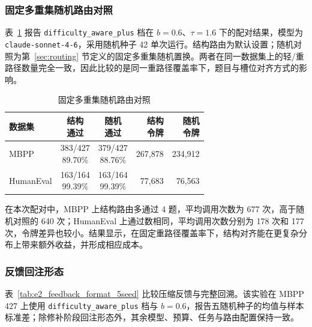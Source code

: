 \subsubsection{固定多重集随机路由对照}

表~\ref{tab:route_random_multiset} 报告 \texttt{difficulty\_aware\_plus} 档在 $b{=}0.6$、$\tau{=}1.6$ 下的配对结果，模型为 \texttt{claude-sonnet-4-6}，采用随机种子 42 单次运行。结构路由为默认设置；随机对照为第~\ref{sec:routing} 节定义的固定多重集随机置换。两者在同一数据集上的轻/重路径数量完全一致，因此比较的是同一重路径覆盖率下，题目与槽位对齐方式的影响。

\begin{table}[H]
\centering
\scriptsize
\caption{固定多重集随机路由对照}
\label{tab:route_random_multiset}
\begin{tabularx}{\linewidth}{@{}p{1.25cm} c c r r@{}}
\toprule
数据集 & \makecell{结构\\通过} & \makecell{随机\\通过} & \makecell{结构\\令牌} & \makecell{随机\\令牌} \\
\midrule
MBPP & \makecell{383/427\\89.70\%} & \makecell{379/427\\88.76\%} & 267{,}878 & 234{,}912 \\
HumanEval & \makecell{163/164\\99.39\%} & \makecell{163/164\\99.39\%} & 77{,}683 & 76{,}563 \\
\bottomrule
\end{tabularx}
\end{table}

在本次配对中，MBPP 上结构路由多通过 4 题，平均调用次数为 677 次，高于随机对照的 640 次；HumanEval 上通过数相同，平均调用次数分别为 178 次和 177 次，令牌差异也较小。结果显示，在固定重路径覆盖率下，结构对齐能在更复杂分布上带来额外收益，并形成相应成本。

\subsubsection{反馈回注形态}

表~\ref{tab:e2_feedback_format_5seed} 比较压缩反馈与完整回溯。该实验在 MBPP 427 上使用 \texttt{difficulty\_aware\_plus} 档与 $b=0.6$，报告五随机种子的均值与样本标准差；除修补阶段回注形态外，其余模型、预算、任务与路由配置保持一致。

